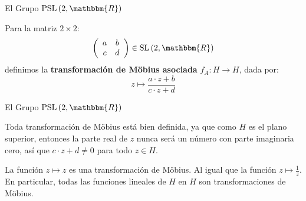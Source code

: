 \documentclass[xcolor=dvipsnames]{beamer}
\theoremstyle{largebreak}
\newcommand\cf[3]{\ensuremath{#1:#2\rightarrow#3}}
\newcommand{\bbm}[1]{\ensuremath{\mathbbm{#1}}}
\newcommand{\SL}[1]{\ensuremath{\textup{SL}\left(#1\right)}}
\newcommand{\PSL}[1]{\ensuremath{\textup{PSL}\left(#1\right)}}
\begin{document}
\begin{frame}{El Grupo $\PSL{2,\bbm{R}}$}
    \begin{mydef}
        Para la matriz $2\times 2$:
        \begin{equation*}
            \left(
                \begin{array}{cc}
                    a & b \\
                    c & d \\
                \end{array}
             \right)\in\SL{2,\bbm{R}}
        \end{equation*}
        definimos la \textbf{transformación de Möbius asociada} $\cf{f_A}{H}{H}$, dada por:
        \begin{equation*}
            z\mapsto\frac{a\cdot z+b}{c\cdot z+d}
        \end{equation*}
    \end{mydef}
\end{frame}

\begin{frame}{El Grupo $\PSL{2,\bbm{R}}$}
    \begin{obs}
        Toda transformación de Möbius está bien definida, ya que como $H$ es el plano superior, entonces la parte real de $z$ nunca será un número con parte imaginaria cero, así que $c\cdot z+d\neq 0$ para todo $z\in H$.
    \end{obs}

    \begin{exa}
        La función $z\mapsto z$ es una transformación de Möbius. Al igual que la función $z\mapsto\frac{1}{z}$. En particular, todas las funciones lineales de $H$ en $H$ son transformaciones de Möbius.
    \end{exa}
\end{frame}
\end{document}
